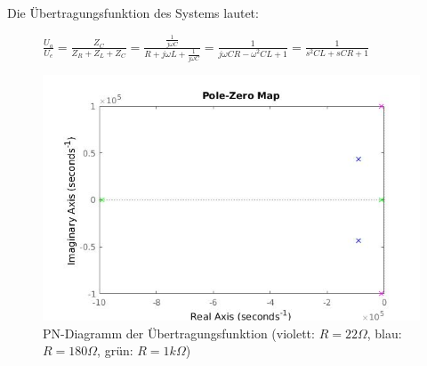 \documentclass[12pt,a4paper,titlepage]{article}
\begin{document}
\noindent Die \"Ubertragungsfunktion des Systems lautet:
\begin{figure}[H]
  \centering
  $\frac{U_a}{U_e} = \frac{Z_C}{Z_R+Z_L+Z_C} = \frac{\frac{1}{j\omega C}}{R+j\omega L+\frac{1}{j\omega C}} = \frac{1}{j\omega CR-\omega^2CL+1} = \frac{1}{s^2CL+sCR+1}$
\end{figure}


\begin{figure}[H]
  \centering
  \includegraphics[width=150mm]{pnd.jpg}
  \caption{PN-Diagramm der \"Ubertragungsfunktion (violett: $R=22\Omega$, blau: $R=180\Omega$, gr\"un: $R=1k\Omega$)}
\end{figure}
\end{document}
